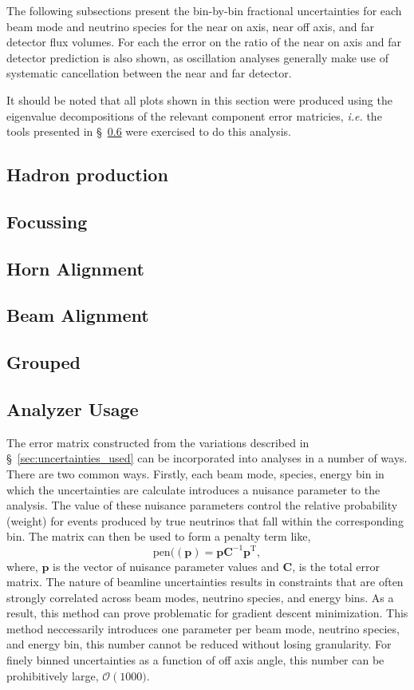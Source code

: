 \documentclass{article}
\begin{document}
The following subsections present the bin-by-bin fractional uncertainties for each beam mode and neutrino species for the near on axis, near off axis, and far detector flux volumes. For each the error on the ratio of the near on axis and far detector prediction is also shown, as oscillation analyses generally make use of systematic cancellation between the near and far detector.

It should be noted that all plots shown in this section were produced using the eigenvalue decompositions of the relevant component error matricies, \textit{i.e.} the tools presented in \S~\ref{sec:analyzer_usage} were exercised to do this analysis.

\subsection{Hadron production}
\subsection{Focussing}
\subsection{Horn Alignment}
\subsection{Beam Alignment}
\subsection{Grouped}

\subsection{Analyzer Usage}
\label{sec:analyzer_usage}

The error matrix constructed from the variations described in \S~\ref{sec:uncertainties_used} can be incorporated into analyses in a number of ways. There are two common ways. Firstly, each beam mode, species, energy bin in which the uncertainties are calculate introduces a nuisance parameter to the analysis. The value of these nuisance parameters control the relative probability (weight) for events produced by true neutrinos that fall within the corresponding bin. The matrix can then be used to form a penalty term like,
\[\textrm{pen}(\left(\textbf{p}\right)=\textbf{p}\mathbf{C}^{-1}\textbf{p}^\mathrm{T},\]
where, $\textbf{p}$ is the vector of nuisance parameter values and $\mathbf{C}$, is the total error matrix. The nature of beamline uncertainties results in constraints that are often strongly correlated across beam modes, neutrino species, and energy bins. As a result, this method can prove problematic for gradient descent minimization. This method neccessarily introduces one parameter per beam mode, neutrino species, and energy bin, this number cannot be reduced without losing granularity. For finely binned uncertainties as a function of off axis angle, this number can be prohibitively large, $\mathcal{O}\left(1000)$.
\end{document}
